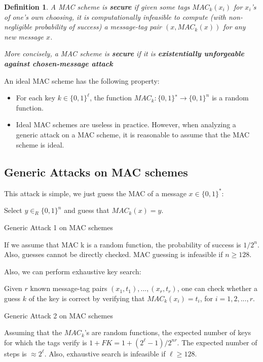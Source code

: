 \documentclass[12pt,titlepage]{article}
\newtheorem{protodefinition}[prototheorem]{Definition}
\newenvironment{definition}
{\colorlet{shadecolor}{cyan!15}\begin{shaded}\begin{protodefinition}\normalfont}{\end{protodefinition}\end{shaded}}
\begin{document}
\begin{definition}
	A MAC scheme is \textbf{secure} if given some tags $MAC_k (x_i)$ for $x_i$'s of one’s own choosing, it is computationally infeasible to compute (with non-negligible probability of success) a message-tag pair $(x, MAC_k(x))$ for any new message $x$.
	
	More concisely, a MAC scheme is \textbf{secure} if it is \textbf{existentially unforgeable against chosen-message attack}
\end{definition}

An ideal MAC scheme has the following property:\begin{itemize}
\item For each key $k \in \{0,1\}^\ell$, the function $MAC_k : \{0, 1\}^∗ \rightarrow \{0, 1\}^n$ is a random function.
\item Ideal MAC schemes are useless in practice. However, when analyzing a generic attack on a MAC scheme, it is reasonable to assume that the MAC scheme is ideal.
\end{itemize}

\subsection{Generic Attacks on MAC schemes}
This attack is simple, we just guess the MAC of a message $x \in \{0,1\}^*$: \begin{algorithm}
Select $y \in_R \{0,1\}^n$ and guess that $MAC_k (x) = y$.
\caption{Generic Attack 1 on MAC schemes}
\end{algorithm}

If we assume that MAC k is a random function, the probability of success is $1/2^n$. Also, guesses cannot be directly checked. MAC guessing is infeasible if $n \geq 128$.


Also, we can perform exhaustive key search: \begin{algorithm}
Given $r$ known message-tag pairs $(x_1,t_1),..., (x_r,t_r)$, one can check whether a guess $k$ of the key is correct by verifying that $MAC_k (x_i) = t_i$, for $i=1, 2, ..., r$.
\caption{Generic Attack 2 on MAC schemes}
\end{algorithm}

Assuming that the $MAC_k$’s are random functions, the expected number of keys for which the tags verify is $1 + FK = 1 + (2^\ell -1)/2^{nr}$. The expected number of steps is $\approx 2^\ell$. Also, exhaustive search is infeasible if $\ell \geq 128$.
\end{document}
